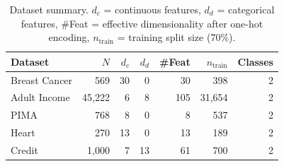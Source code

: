 \begin{table}[t]
\centering
\caption{Dataset summary. $d_c$ = continuous features, $d_d$ = categorical features, \#Feat = effective dimensionality after one-hot encoding, $n_{\text{train}}$ = training split size (70\%).}
\label{tab:datasets}
\scriptsize
\setlength{\tabcolsep}{5pt}
\renewcommand{\arraystretch}{1.1}
\begin{tabular}{l r r r r r r}
\toprule
\rowcolor{tablehead}
\textbf{Dataset} & \textbf{$N$} & \textbf{$d_c$} & \textbf{$d_d$} & \textbf{\#Feat} & \textbf{$n_{\text{train}}$} & \textbf{Classes} \\
\midrule
Breast Cancer & 569 & 30 & 0 & 30 & 398 & 2 \\
Adult Income & 45{,}222 & 6 & 8 & 105 & 31{,}654 & 2 \\
PIMA & 768 & 8 & 0 & 8 & 537 & 2 \\
Heart & 270 & 13 & 0 & 13 & 189 & 2 \\
Credit & 1{,}000 & 7 & 13 & 61 & 700 & 2 \\
\bottomrule
\end{tabular}
\end{table}
